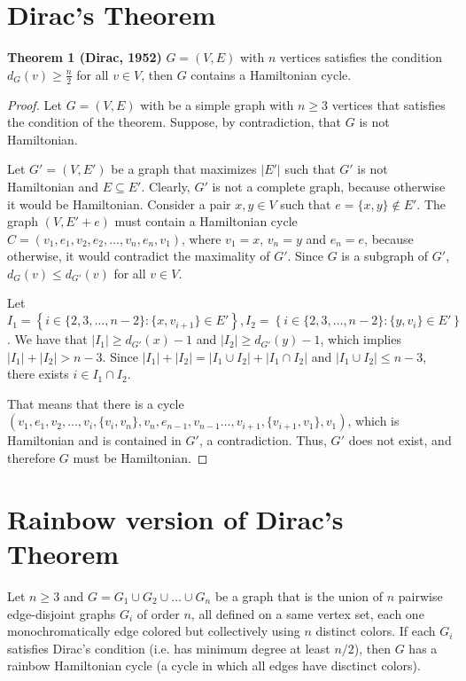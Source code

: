 \section{Dirac's Theorem}

\textbf{Theorem 1 (Dirac, 1952)} $G = (V, E)$ with $n$ vertices satisfies the condition $d_G(v) \geq \frac{n}{2}$ for all $v \in V$, 
then $G$ contains a Hamiltonian cycle.

\begin{proof}
    Let $G = (V, E)$ with be a simple graph with $n \geq 3$ vertices that satisfies the condition of the theorem. Suppose, 
    by contradiction, that $G$ is not Hamiltonian. 

    Let $G' = (V, E')$ be a graph that maximizes $|E'|$ such that $G'$ is not Hamiltonian and $E \subseteq E'$. 
    Clearly, $G'$ is not a complete graph, because otherwise it would be Hamiltonian. Consider a pair $x, y \in V$ such that 
    $e = \{x, y\} \not\in E'$.
    The graph $(V, E' + e)$ must contain a Hamiltonian cycle $C = (v_1, e_1, v_2, e_2, \ldots, v_n, e_{n}, v_1)$, where 
    $v_1 = x$, $v_n = y$ and $e_n = e$, because otherwise, it would contradict the maximality of $G'$.
    Since $G$ is a subgraph of $G'$, $d_G(v) \leq d_{G'}(v)$ for all $v \in V$.

    Let $I_1 = \left\{i \in \{2, 3, \dots, n-2\} : \{x, v_{i+1}\} \in E'\right\}, 
    I_2 = \left\{ i \in \{2, 3, \dots, n - 2\} : \{y, v_{i}\} \in E' \right\}$.
    We have that $|I_1| \geq d_{G'}(x) - 1$ and $|I_2| \geq d_{G'}(y) - 1$,
    which implies $|I_1| + |I_2| > n - 3$. 
    Since $|I_1| + |I_2| = |I_1 \cup I_2| + |I_1 \cap I_2|$ and $|I_1 \cup I_2| \leq n - 3$, 
    there exists $i \in I_1 \cap I_2$.

    That means that there is a cycle 
    $(v_1, e_1, v_2, \dots, v_i, \{v_i, v_n\}, v_n, e_{n - 1}, v_{n-1} \dots , v_{i+1}, \{v_{i+1}, v_1\}, v_1)$, 
    which is Hamiltonian and is contained in $G'$, a contradiction. Thus, $G'$ does not exist,
    and therefore $G$ must be Hamiltonian.

\end{proof}

\section{Rainbow version of Dirac's Theorem}

Let $n\geq 3$ and $G = G_1 \cup G_2 \cup \ldots \cup
G_n$ be a graph that is the union of $n$ pairwise edge-disjoint graphs
$G_i$ of order $n$, all defined on a same vertex set, each one
monochromatically edge colored but collectively using $n$ distinct
colors. If each $G_i$ satisfies Dirac's condition (i.e. has minimum 
degree at least $n/2$), then $G$ has a rainbow Hamiltonian cycle (a cycle in which all edges have
disctinct colors).
